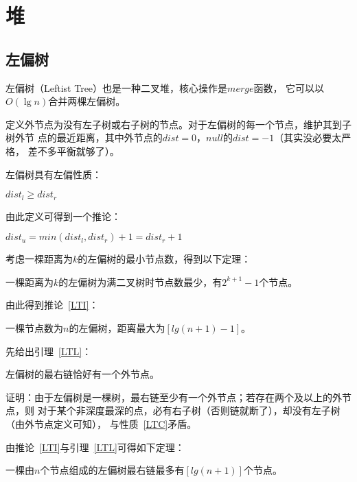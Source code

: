 \section{堆}
\subsection{左偏树}
左偏树（Leftist Tree）也是一种二叉堆，核心操作是$merge$函数，
它可以以$O(\lg n)$合并两棵左偏树。

定义外节点为没有左子树或右子树的节点。对于左偏树的每一个节点，维护其到子树外节
点的最近距离，其中外节点的$dist=0$，$null$的$dist=-1$（其实没必要太严格，
差不多平衡就够了）。

左偏树具有左偏性质：
\begin{property}\label{LTC}
    $dist_l \geq dist_r$
\end{property}

由此定义可得到一个推论：

\begin{inference}
    $dist_u=min(dist_l,dist_r)+1=dist_r+1$
\end{inference}

考虑一棵距离为$k$的左偏树的最小节点数，得到以下定理：

\begin{theorem}
    一棵距离为$k$的左偏树为满二叉树时节点数最少，有$2^{k+1}-1$个节点。
\end{theorem}

由此得到推论~\ref{LTI}：

\begin{inference}\label{LTI}
    一棵节点数为$n$的左偏树，距离最大为$[lg(n+1)-1]$。
\end{inference}

先给出引理~\ref{LTL}：

\begin{lemma}\label{LTL}
    左偏树的最右链恰好有一个外节点。
\end{lemma}

证明：由于左偏树是一棵树，最右链至少有一个外节点；若存在两个及以上的外节点，则
对于某个非深度最深的点，必有右子树（否则链就断了），却没有左子树（由外节点定义可知），
与性质~\ref{LTC}矛盾。

由推论~\ref{LTI}与引理~\ref{LTL}可得如下定理：

\begin{theorem}\label{LTT}
    一棵由$n$个节点组成的左偏树最右链最多有$[lg(n+1)]$个节点。
\end{theorem}


